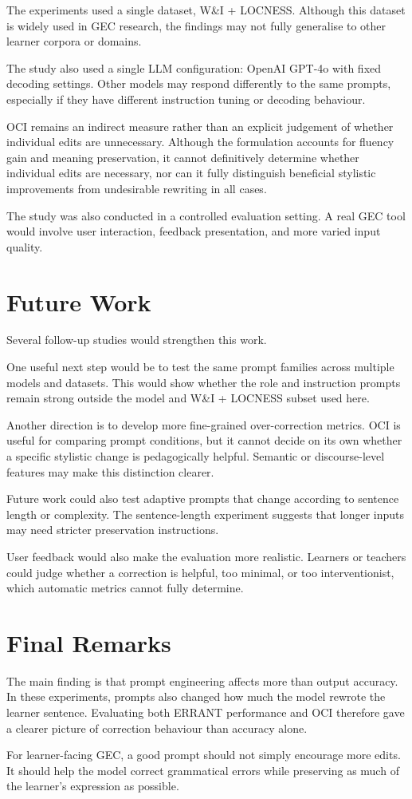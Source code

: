 The experiments used a single dataset, W\&I + LOCNESS. Although this dataset is widely used in GEC research, the findings may not fully generalise to other learner corpora or domains.

The study also used a single LLM configuration: OpenAI GPT-4o with fixed decoding settings. Other models may respond differently to the same prompts, especially if they have different instruction tuning or decoding behaviour.

OCI remains an indirect measure rather than an explicit judgement of whether individual edits are unnecessary. Although the formulation accounts for fluency gain and meaning preservation, it cannot definitively determine whether individual edits are necessary, nor can it fully distinguish beneficial stylistic improvements from undesirable rewriting in all cases.

The study was also conducted in a controlled evaluation setting. A real GEC tool would involve user interaction, feedback presentation, and more varied input quality.

\section{Future Work}

Several follow-up studies would strengthen this work.

One useful next step would be to test the same prompt families across multiple models and datasets. This would show whether the role and instruction prompts remain strong outside the model and W\&I + LOCNESS subset used here.

Another direction is to develop more fine-grained over-correction metrics. OCI is useful for comparing prompt conditions, but it cannot decide on its own whether a specific stylistic change is pedagogically helpful. Semantic or discourse-level features may make this distinction clearer.

Future work could also test adaptive prompts that change according to sentence length or complexity. The sentence-length experiment suggests that longer inputs may need stricter preservation instructions.

User feedback would also make the evaluation more realistic. Learners or teachers could judge whether a correction is helpful, too minimal, or too interventionist, which automatic metrics cannot fully determine.

\section{Final Remarks}

The main finding is that prompt engineering affects more than output accuracy. In these experiments, prompts also changed how much the model rewrote the learner sentence. Evaluating both ERRANT performance and OCI therefore gave a clearer picture of correction behaviour than accuracy alone.

For learner-facing GEC, a good prompt should not simply encourage more edits. It should help the model correct grammatical errors while preserving as much of the learner's expression as possible.
